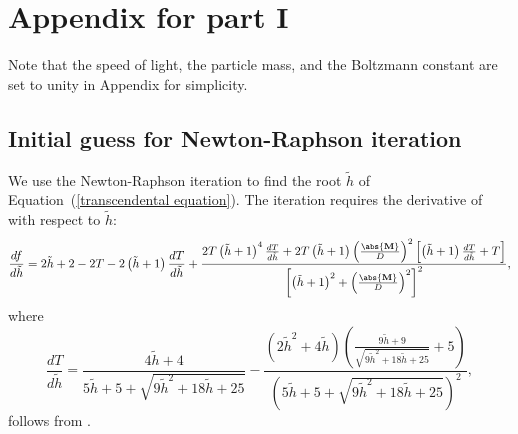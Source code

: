 \chapter{Appendix for part I}
\label{c:appendix}
Note that the speed of light, the particle mass, and the Boltzmann constant are set to unity in Appendix for simplicity.

\section{Initial guess for Newton-Raphson iteration}
\label{The choice of initial guesses}
We use the Newton-Raphson iteration to find the root $\tilde{h}$ of Equation~(\ref{transcendental equation}). The iteration requires the derivative of  with respect to $\tilde{h}$:
\begin{equation}
\frac{df}{d\tilde{h}}=2\tilde{h}+2-2T-2\left(\tilde{h}+1\right)\frac{dT}{d\tilde{h}}+\frac{2T\left(\tilde{h}+1\right)^4\frac{dT}{d\tilde{h}}+2T\left(\tilde{h}+1\right)\left(\frac{\abs{\mathbf{M}}}{D}\right)^2\left[\left(\tilde{h}+1\right)\frac{dT}{d\tilde{h}}+T\right]}{\left[\left(\tilde{h}+1\right)^2+\left(\frac{\abs{\mathbf{M}}}{D}\right)^2\right]^2},
\end{equation}
where
\begin{equation}
\frac{dT}{d\tilde{h}}=\frac{4\tilde{h}+4}{5\tilde{h}+5+\sqrt{9\tilde{h}^2+18\tilde{h}+25}}
-\frac{\left(2\tilde{h}^2+4\tilde{h}\right)\left(\frac{9\tilde{h}+9}{\sqrt{9\tilde{h}^2+18\tilde{h}+25}}+5\right)}{\left(5\tilde{h}+5+\sqrt{9\tilde{h}^2+18\tilde{h}+25}\right)^2},
\label{dT_dh}
\end{equation}
follows from .

